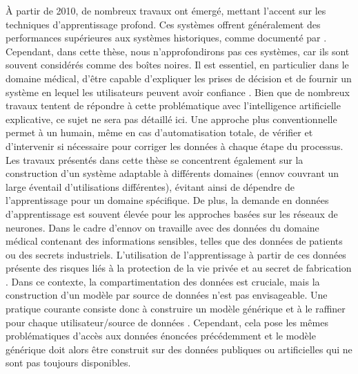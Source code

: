 À partir de 2010, de nombreux travaux ont émergé, mettant l'accent sur les techniques d'apprentissage profond.
Ces systèmes offrent généralement des performances supérieures aux systèmes historiques, comme documenté par \cite{al-aswadiAutomaticOntologyConstruction2020}.
Cependant, dans cette thèse, nous n'approfondirons pas ces systèmes, car ils sont souvent considérés comme des boîtes noires.
Il est essentiel, en particulier dans le domaine médical, d'être capable d'expliquer les prises de décision et de fournir un système en lequel les utilisateurs peuvent avoir confiance \cite{ribeiroWhyShouldTrust2016}.
Bien que de nombreux travaux tentent de répondre à cette problématique avec l'intelligence artificielle explicative, ce sujet ne sera pas détaillé ici.
Une approche plus conventionnelle permet à un humain, même en cas d'automatisation totale, de vérifier et d'intervenir si nécessaire pour corriger les données à chaque étape du processus.
Les travaux présentés dans cette thèse se concentrent également sur la construction d'un système adaptable à différents domaines (\gls{ennov} couvrant un large éventail d'utilisations différentes), évitant ainsi de dépendre de l'apprentissage pour un domaine spécifique.
De plus, la demande en données d'apprentissage est souvent élevée pour les approches basées sur les réseaux de neurones.
Dans le cadre d'\gls{ennov} on travaille avec des données du domaine médical contenant des informations sensibles, telles que des données de patients ou des secrets industriels.
L'utilisation de l'apprentissage à partir de ces données présente des risques liés à la protection de la vie privée et au secret de fabrication \cite{fredriksonModelInversionAttacks2015,songPrivacyRisksSecuring2019}.
Dans ce contexte, la compartimentation des données est cruciale, mais la construction d'un modèle par source de données n'est pas envisageable.
Une pratique courante consiste donc à construire un modèle générique et à le raffiner pour chaque utilisateur/source de données \cite{ribeiroWhyShouldTrust2016}.
Cependant, cela pose les mêmes problématiques d'accès aux données énoncées précédemment et le modèle générique doit alors être construit sur des données publiques ou artificielles qui ne sont pas toujours disponibles.

